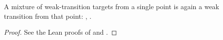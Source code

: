 \begin{lemma}
  \label{lem:bind}
  \leanok
  A mixture of weak-transition targets from a single point is again a weak transition from that point: , .
\end{lemma}

\begin{proof}\leanok
  See the Lean proofs of  and .
\end{proof}
